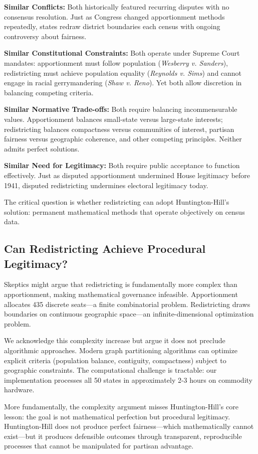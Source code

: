 \textbf{Similar Conflicts:} Both historically featured recurring disputes with no consensus resolution. Just as Congress changed apportionment methods repeatedly, states redraw district boundaries each census with ongoing controversy about fairness.

\textbf{Similar Constitutional Constraints:} Both operate under Supreme Court mandates: apportionment must follow population (\textit{Wesberry v. Sanders}), redistricting must achieve population equality (\textit{Reynolds v. Sims}) and cannot engage in racial gerrymandering (\textit{Shaw v. Reno}). Yet both allow discretion in balancing competing criteria.

\textbf{Similar Normative Trade-offs:} Both require balancing incommensurable values. Apportionment balances small-state versus large-state interests; redistricting balances compactness versus communities of interest, partisan fairness versus geographic coherence, and other competing principles. Neither admits perfect solutions.

\textbf{Similar Need for Legitimacy:} Both require public acceptance to function effectively. Just as disputed apportionment undermined House legitimacy before 1941, disputed redistricting undermines electoral legitimacy today.

The critical question is whether redistricting can adopt Huntington-Hill's solution: permanent mathematical methods that operate objectively on census data.

\subsection{Can Redistricting Achieve Procedural Legitimacy?}

Skeptics might argue that redistricting is fundamentally more complex than apportionment, making mathematical governance infeasible. Apportionment allocates 435 discrete seats—a finite combinatorial problem. Redistricting draws boundaries on continuous geographic space—an infinite-dimensional optimization problem.

We acknowledge this complexity increase but argue it does not preclude algorithmic approaches. Modern graph partitioning algorithms can optimize explicit criteria (population balance, contiguity, compactness) subject to geographic constraints. The computational challenge is tractable: our implementation processes all 50 states in approximately 2-3 hours on commodity hardware.

More fundamentally, the complexity argument misses Huntington-Hill's core lesson: the goal is not mathematical perfection but procedural legitimacy. Huntington-Hill does not produce perfect fairness—which mathematically cannot exist—but it produces defensible outcomes through transparent, reproducible processes that cannot be manipulated for partisan advantage.

